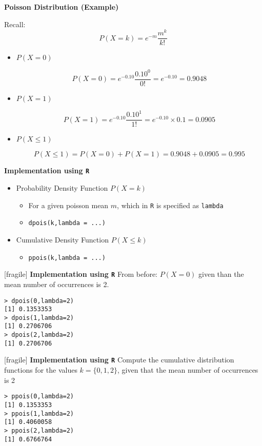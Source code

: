 \documentclass[a4paper,12pt]{article}
\begin{document}
{
\textbf{Poisson Distribution (Example)}

Recall: \[P(X = k) = e^{-m}\frac{m^k}{k!}\]


\begin{itemize}

\item $P(X = 0)$

\[P(X = 0) = e^{-0.10}\frac{0.10^0}{0!} = e^{-0.10} = 0.9048\]


\item $P(X = 1)$

\[P(X = 1) = e^{-0.10}\frac{0.10^1}{1!} = e^{-0.10}\times 0.1 = 0.0905\]

\item $P(X \leq 1)$

\[P(X \leq 1) = P(X = 0) + P(X = 1) = 0.9048 + 0.0905 = 0.995\]

\end{itemize}
}

{
\textbf{Implementation using \texttt{R}}

\begin{itemize}
\item Probability Density Function $P(X = k)$
\begin{itemize}
\item For a given poisson mean $m$, which in \texttt{R} is specified as \texttt{lambda} 
\item \texttt{dpois(k,lambda = ...)} 
\end{itemize}
\item Cumulative Density Function $P(X \leq k)$
\begin{itemize}
\item \texttt{ppois(k,lambda = ...)}
\end{itemize}
\end{itemize}

}


[fragile]
\textbf{Implementation using \texttt{R}}
From before: $P(X = 0)$ given than the mean number of occurrences is 2.

\begin{verbatim}
> dpois(0,lambda=2)
[1] 0.1353353
> dpois(1,lambda=2)
[1] 0.2706706
> dpois(2,lambda=2)
[1] 0.2706706
\end{verbatim}




[fragile]
\textbf{Implementation using \texttt{R}}
Compute the cumulative distribution functions for the values $k=\{0,1,2\}$, given that the mean number of occurrences is 2

\begin{verbatim}
> ppois(0,lambda=2)
[1] 0.1353353
> ppois(1,lambda=2)
[1] 0.4060058
> ppois(2,lambda=2)
[1] 0.6766764
\end{verbatim}
\end{document}
